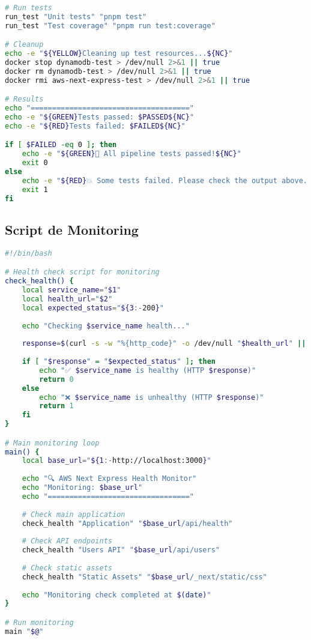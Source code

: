 \begin{lstlisting}[language=bash, caption=scripts/test-pipeline.sh]
# Run tests
run_test "Unit tests" "pnpm test"
run_test "Test coverage" "pnpm run test:coverage"

# Cleanup
echo -e "${YELLOW}Cleaning up test resources...${NC}"
docker stop dynamodb-test > /dev/null 2>&1 || true
docker rm dynamodb-test > /dev/null 2>&1 || true
docker rmi aws-next-express-test > /dev/null 2>&1 || true

# Results
echo "====================================="
echo -e "${GREEN}Tests passed: $PASSED${NC}"
echo -e "${RED}Tests failed: $FAILED${NC}"

if [ $FAILED -eq 0 ]; then
    echo -e "${GREEN}🎉 All pipeline tests passed!${NC}"
    exit 0
else
    echo -e "${RED}💥 Some tests failed. Please check the output above.${NC}"
    exit 1
fi
\end{lstlisting}

\subsection{Script de Monitoring}

\begin{lstlisting}[language=bash, caption=scripts/monitor.sh]
#!/bin/bash

# Health check script for monitoring
check_health() {
    local service_name="$1"
    local health_url="$2"
    local expected_status="${3:-200}"
    
    echo "Checking $service_name health..."
    
    response=$(curl -s -w "%{http_code}" -o /dev/null "$health_url" || echo "000")
    
    if [ "$response" = "$expected_status" ]; then
        echo "✅ $service_name is healthy (HTTP $response)"
        return 0
    else
        echo "❌ $service_name is unhealthy (HTTP $response)"
        return 1
    fi
}

# Main monitoring loop
main() {
    local base_url="${1:-http://localhost:3000}"
    
    echo "🔍 AWS Next Express Health Monitor"
    echo "Monitoring: $base_url"
    echo "================================="
    
    # Check main application
    check_health "Application" "$base_url/api/health"
    
    # Check API endpoints
    check_health "Users API" "$base_url/api/users"
    
    # Check static assets
    check_health "Static Assets" "$base_url/_next/static/css"
    
    echo "Monitoring check completed at $(date)"
}

# Run monitoring
main "$@"
\end{lstlisting}

